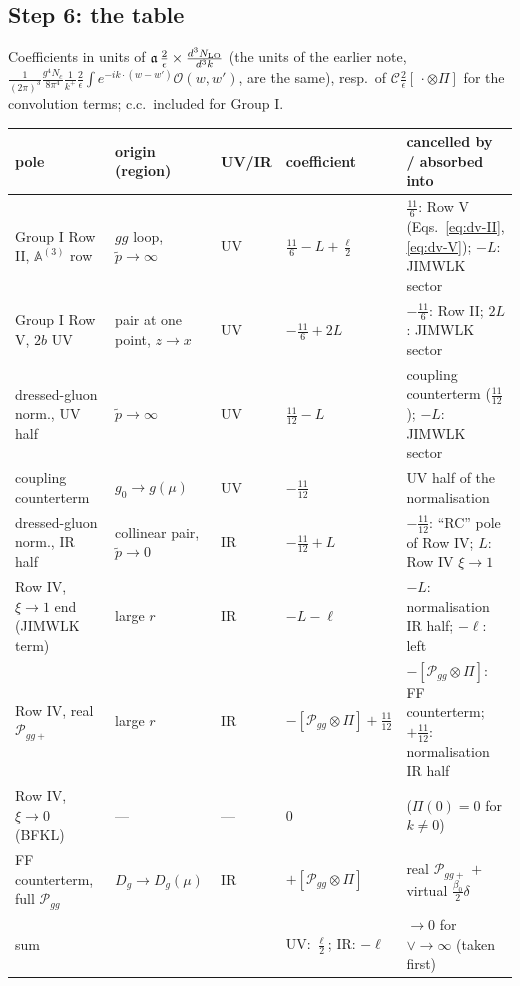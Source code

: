 \documentclass[9pt]{article}
\def\mf#1{\mathbb{#1}}
\numberwithin{equation}{section}
\begin{document}
{\subsection*{Step 6: the table}
\noindent Coefficients in units of $\mathfrak{a}\,\frac{2}{\epsilon}\times\frac{d^{3}N_{\rm LO}}{d^{3}k}$ (the units of the earlier note, $\frac{1}{(2\pi)^{3}}\frac{g^{4}N_{c}}{8\pi^{4}}\frac{1}{k^{+}}\frac{2}{\epsilon}\int e^{-ik\cdot(w-w')}\mathcal{O}(w,w')$, are the same), resp.\ of $\mathcal{C}\frac{2}{\epsilon}[\,\cdot\otimes\Pi]$ for the convolution terms; c.c.\ included for Group I.
\begin{center}
\renewcommand{\arraystretch}{1.3}\small
\begin{tabular}{|p{4.3cm}|p{3.6cm}|p{0.9cm}|p{2.9cm}|p{5.4cm}|}\hline
pole & origin (region) & UV/IR & coefficient & cancelled by / absorbed into\\\hline
Group I Row II, $\mf{A}^{(3)}$ row & $gg$ loop, $\tilde p\to\infty$ & UV & $\frac{11}{6}-L+\frac{\ell}{2}$ & $\frac{11}{6}$: Row V (Eqs.~\eqref{eq:dv-II}, \eqref{eq:dv-V}); $-L$: JIMWLK sector\\
Group I Row V, $2b$ UV & pair at one point, $z\to x$ & UV & $-\frac{11}{6}+2L$ & $-\frac{11}{6}$: Row II; $2L$: JIMWLK sector\\
dressed-gluon norm., UV half & $\tilde p\to\infty$ & UV & $\frac{11}{12}-L$ & coupling counterterm ($\frac{11}{12}$); $-L$: JIMWLK sector\\
coupling counterterm & $g_{0}\to g(\mu)$ & UV & $-\frac{11}{12}$ & UV half of the normalisation\\\hline
dressed-gluon norm., IR half & collinear pair, $\tilde p\to0$ & IR & $-\frac{11}{12}+L$ & $-\frac{11}{12}$: ``RC'' pole of Row IV; $L$: Row IV $\xi\to1$\\
Row IV, $\xi\to1$ end (JIMWLK term) & large $r$ & IR & $-L-\ell$ & $-L$: normalisation IR half; $-\ell$: left\\
Row IV, real $\mathcal{P}_{gg+}$ & large $r$ & IR & $-[\mathcal{P}_{gg}\otimes\Pi]+\frac{11}{12}$ & $-[\mathcal{P}_{gg}\otimes\Pi]$: FF counterterm; $+\frac{11}{12}$: normalisation IR half\\
Row IV, $\xi\to0$ (BFKL) & --- & --- & $0$ & ($\Pi(0)=0$ for $k\neq0$)\\
FF counterterm, full $\mathcal{P}_{gg}$ & $D_{g}\to D_{g}(\mu)$ & IR & $+[\mathcal{P}_{gg}\otimes\Pi]$ & real $\mathcal{P}_{gg+}$ $+$ virtual $\frac{\beta_{0}}{2}\delta$\\\hline
sum & & & UV: $\frac{\ell}{2}$; IR: $-\ell$ & $\to0$ for $\vee\to\infty$ (taken first)\\\hline

\end{tabular}
\end{center}}
\end{document}
